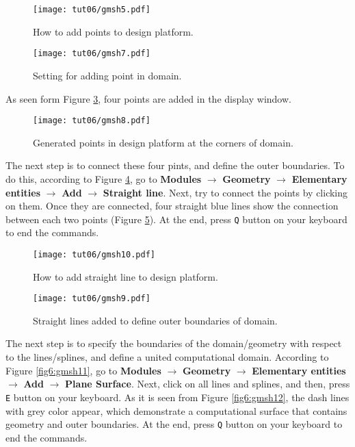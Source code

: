 \begin{figure}[htbp]
    \centering
    \texttt{[image: tut06/gmsh5.pdf]}
    \caption{How to add points to design platform.}
    \label{fig6:gmsh5}
\end{figure}
\begin{figure}[htbp]
    \centering
    \texttt{[image: tut06/gmsh7.pdf]}
    \caption{Setting for adding point in domain.}
    \label{fig6:gmsh7}
\end{figure}
As seen form Figure \ref{fig6:gmsh8}, four points are added in the display window.
\begin{figure}[htbp]
    \centering
    \texttt{[image: tut06/gmsh8.pdf]}
    \caption{Generated points in design platform at the corners of domain.}
    \label{fig6:gmsh8}
\end{figure}
The next step is to connect these four pints, and define the outer boundaries. To do this, according to Figure \ref{fig6:gmsh10}, go to \textbf{Modules} $\rightarrow$ \textbf{Geometry} $\rightarrow$ \textbf{Elementary entities} $\rightarrow$ \textbf{Add} $\rightarrow$ \textbf{Straight line}. Next, try to connect the points by clicking on them. Once they are connected, four straight blue lines show the connection between each two points (Figure \ref{fig6:gmsh9}). At the end, press \texttt{Q} button on your keyboard to end the commands.
\begin{figure}[htbp]
    \centering
    \texttt{[image: tut06/gmsh10.pdf]}
    \caption{How to add straight line to design platform.}
    \label{fig6:gmsh10}
\end{figure}
\begin{figure}[htbp]
    \centering
    \texttt{[image: tut06/gmsh9.pdf]}
    \caption{Straight lines added to define outer boundaries of domain.}
    \label{fig6:gmsh9}
\end{figure}
The next step is to specify the boundaries of the domain/geometry with respect to the lines/splines, and define a united computational domain. According to Figure  \ref{fig6:gmsh11}, go to \textbf{Modules} $\rightarrow$ \textbf{Geometry} $\rightarrow$ \textbf{Elementary entities} $\rightarrow$ \textbf{Add} $\rightarrow$ \textbf{Plane Surface}. Next, click on all lines and splines, and then, press \texttt{E} button on your keyboard. As it is seen from Figure \ref{fig6:gmsh12}, the dash lines with grey color appear, which demonstrate a computational surface that contains geometry and outer boundaries. At the end, press \texttt{Q} button on your keyboard to end the commands.
